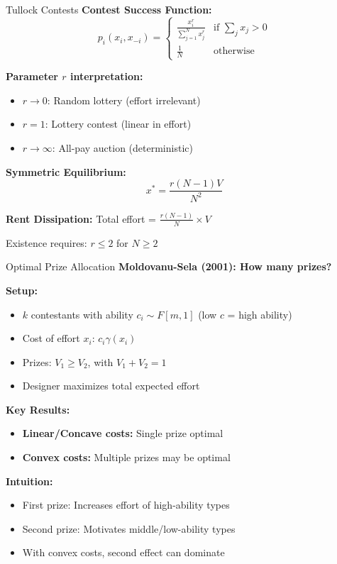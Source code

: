 \documentclass[xcolor={x11names}]{beamer}
\begin{document}
\begin{frame}{Tullock Contests}
\textbf{Contest Success Function:}
$$p_i(x_i, x_{-i}) = \begin{cases}
\frac{x_i^r}{\sum_{j=1}^N x_j^r} & \text{if } \sum_j x_j > 0 \\
\frac{1}{N} & \text{otherwise}
\end{cases}$$

\textbf{Parameter $r$ interpretation:}
\begin{itemize}
\item $r \to 0$: Random lottery (effort irrelevant)
\item $r = 1$: Lottery contest (linear in effort)
\item $r \to \infty$: All-pay auction (deterministic)
\end{itemize}

\textbf{Symmetric Equilibrium:}
$$x^* = \frac{r(N-1)V}{N^2}$$

\textbf{Rent Dissipation:} Total effort = $\frac{r(N-1)}{N} \times V$

Existence requires: $r \leq 2$ for $N \geq 2$
\end{frame}

\begin{frame}{Optimal Prize Allocation}
\textbf{Moldovanu-Sela (2001): How many prizes?}

\textbf{Setup:}
\begin{itemize}
\item $k$ contestants with ability $c_i \sim F[m,1]$ (low $c$ = high ability)
\item Cost of effort $x_i$: $c_i\gamma(x_i)$
\item Prizes: $V_1 \geq V_2$, with $V_1 + V_2 = 1$
\item Designer maximizes total expected effort
\end{itemize}

\textbf{Key Results:}
\begin{itemize}
\item \textbf{Linear/Concave costs:} Single prize optimal
\item \textbf{Convex costs:} Multiple prizes may be optimal
\end{itemize}

\textbf{Intuition:}
\begin{itemize}
\item First prize: Increases effort of high-ability types
\item Second prize: Motivates middle/low-ability types
\item With convex costs, second effect can dominate
\end{itemize}
\end{frame}
\end{document}
